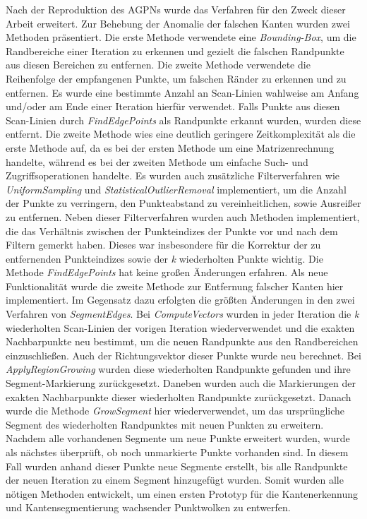 Nach der Reproduktion des AGPNs wurde das Verfahren für den Zweck dieser Arbeit erweitert. Zur Behebung der Anomalie der falschen Kanten wurden zwei Methoden präsentiert. Die erste Methode verwendete eine \textit{Bounding-Box}, um die Randbereiche einer Iteration zu erkennen und gezielt die falschen Randpunkte aus diesen Bereichen zu entfernen. Die zweite Methode verwendete die Reihenfolge der empfangenen Punkte, um falschen Ränder zu erkennen und zu entfernen. Es wurde eine bestimmte Anzahl an Scan-Linien wahlweise am Anfang und/oder am Ende einer Iteration hierfür verwendet. Falls Punkte aus diesen Scan-Linien durch \textit{FindEdgePoints} als Randpunkte erkannt wurden, wurden diese entfernt. Die zweite Methode wies eine deutlich geringere Zeitkomplexität als die erste Methode auf, da es bei der ersten Methode um eine Matrizenrechnung handelte, während es bei der zweiten Methode um einfache Such- und Zugriffsoperationen handelte. Es wurden auch zusätzliche Filterverfahren wie \textit{UniformSampling} und \textit{StatisticalOutlierRemoval} \autocite{rusu_3d_2011} \autocite{rusu_towards_2008} implementiert, um die Anzahl der Punkte zu verringern, den Punkteabstand zu vereinheitlichen, sowie Ausreißer zu entfernen. Neben dieser Filterverfahren wurden auch Methoden implementiert, die das Verhältnis zwischen der Punkteindizes der Punkte vor und nach dem Filtern gemerkt haben. Dieses war insbesondere für die Korrektur der zu entfernenden Punkteindizes sowie der \textit{k} wiederholten Punkte wichtig. Die Methode \textit{FindEdgePoints} hat keine großen Änderungen erfahren. Als neue Funktionalität wurde die zweite Methode zur Entfernung falscher Kanten hier implementiert. Im Gegensatz dazu erfolgten die größten Änderungen in den zwei Verfahren von \textit{SegmentEdges}. Bei \textit{ComputeVectors} wurden in jeder Iteration die \textit{k} wiederholten Scan-Linien der vorigen Iteration wiederverwendet und die exakten Nachbarpunkte neu bestimmt, um die neuen Randpunkte aus den Randbereichen einzuschließen. Auch der Richtungsvektor dieser Punkte wurde neu berechnet. Bei \textit{ApplyRegionGrowing} wurden diese wiederholten Randpunkte gefunden und ihre Segment-Markierung zurückgesetzt. Daneben wurden auch die Markierungen der exakten Nachbarpunkte dieser wiederholten Randpunkte zurückgesetzt. Danach wurde die Methode \textit{GrowSegment} hier wiederverwendet, um das ursprüngliche Segment des wiederholten Randpunktes mit neuen Punkten zu erweitern. Nachdem alle vorhandenen Segmente um neue Punkte erweitert wurden, wurde als nächstes überprüft, ob noch unmarkierte Punkte vorhanden sind. In diesem Fall wurden anhand dieser Punkte neue Segmente erstellt, bis alle Randpunkte der neuen Iteration zu einem Segment hinzugefügt wurden. Somit wurden alle nötigen Methoden entwickelt, um einen ersten Prototyp für die Kantenerkennung und Kantensegmentierung wachsender Punktwolken zu entwerfen.

